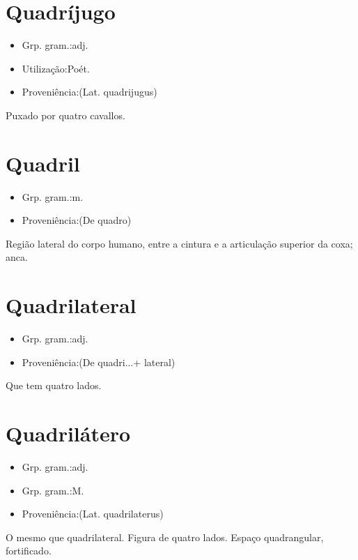 \section{Quadríjugo}
\begin{itemize}
\item {Grp. gram.:adj.}
\end{itemize}
\begin{itemize}
\item {Utilização:Poét.}
\end{itemize}
\begin{itemize}
\item {Proveniência:(Lat. \textunderscore quadrijugus\textunderscore )}
\end{itemize}
Puxado por quatro cavallos.
\section{Quadril}
\begin{itemize}
\item {Grp. gram.:m.}
\end{itemize}
\begin{itemize}
\item {Proveniência:(De \textunderscore quadro\textunderscore )}
\end{itemize}
Região lateral do corpo humano, entre a cintura e a articulação superior da coxa; anca.
\section{Quadrilateral}
\begin{itemize}
\item {Grp. gram.:adj.}
\end{itemize}
\begin{itemize}
\item {Proveniência:(De \textunderscore quadri...\textunderscore  + \textunderscore lateral\textunderscore )}
\end{itemize}
Que tem quatro lados.
\section{Quadrilátero}
\begin{itemize}
\item {Grp. gram.:adj.}
\end{itemize}
\begin{itemize}
\item {Grp. gram.:M.}
\end{itemize}
\begin{itemize}
\item {Proveniência:(Lat. \textunderscore quadrilaterus\textunderscore )}
\end{itemize}
O mesmo que \textunderscore quadrilateral\textunderscore .
Figura de quatro lados.
Espaço quadrangular, fortificado.
